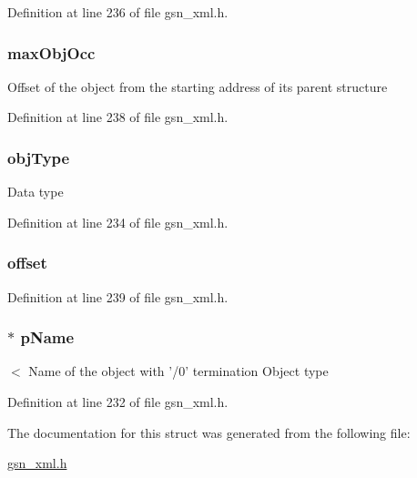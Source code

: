 Definition at line 236 of file gsn\_\-xml.h.

\hypertarget{a00435_afd475a31316e41c556764d1ccfbfe1e6}{
\subsubsection[{maxObjOcc}]{ {\bf maxObjOcc}}}
\label{a00435_afd475a31316e41c556764d1ccfbfe1e6}
Offset of the object from the starting address of its parent structure 

Definition at line 238 of file gsn\_\-xml.h.

\hypertarget{a00435_a8486ffe7e67969e74c4cf5f87193bac1}{
\subsubsection[{objType}]{ {\bf objType}}}
\label{a00435_a8486ffe7e67969e74c4cf5f87193bac1}
Data type 

Definition at line 234 of file gsn\_\-xml.h.

\hypertarget{a00435_af7c1ea69079dc905761ed0a19ec036ab}{
\subsubsection[{offset}]{ {\bf offset}}}
\label{a00435_af7c1ea69079dc905761ed0a19ec036ab}


Definition at line 239 of file gsn\_\-xml.h.

\hypertarget{a00435_a9f24bc0b240cf182a580ac39c83e01bf}{
\subsubsection[{pName}]{$\ast$ {\bf pName}}}
\label{a00435_a9f24bc0b240cf182a580ac39c83e01bf}
$<$ Name of the object with '/0' termination Object type 

Definition at line 232 of file gsn\_\-xml.h.



The documentation for this struct was generated from the following file:\begin{DoxyCompactItemize}
\item 
\hyperlink{a00616}{gsn\_\-xml.h}\end{DoxyCompactItemize}

